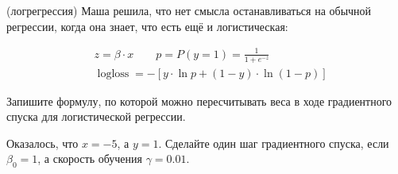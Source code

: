 \documentclass[12pt, a4paper, oneside]{article}
\DeclareMathOperator{\logloss}{logloss}
\theoremstyle{plain} %
\theoremstyle{definition}
\begin{document}
\begin{problem}{(логрегрессия)}
	Маша решила, что нет смысла останавливаться на обычной регрессии, когда она знает, что есть ещё и логистическая:
	
	\begin{equation*}
		\begin{aligned}
			& z  = \beta \cdot x \qquad p = P(y = 1) = \frac{1}{1 + e^{-z}} \\
			& \logloss = -[ y \cdot \ln p + (1 - y) \cdot \ln (1 - p) ]
		\end{aligned}
	\end{equation*}
	
	Запишите формулу, по которой можно пересчитывать веса в ходе градиентного спуска для логистической регрессии. 
	
	Оказалось, что $x = -5$, а $y = 1$. Сделайте один шаг градиентного спуска, если $\beta_0 = 1$, а скорость обучения $\gamma = 0.01$. 
\end{problem}
\end{document}
